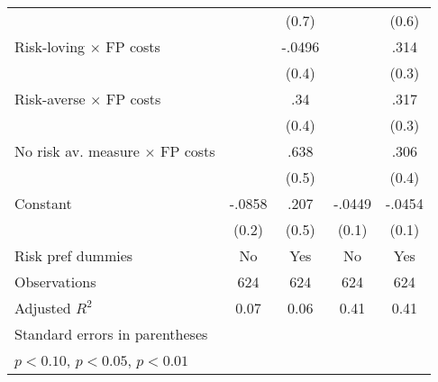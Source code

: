 \begin{table}[htbp]
\begin{tabular}{l*{4}{c}}
                &                  &    (0.7)         &                  &    (0.6)         \\
Risk-loving $\times$ FP costs&                  &   -.0496         &                  &     .314         \\
                &                  &    (0.4)         &                  &    (0.3)         \\
Risk-averse $\times$ FP costs&                  &      .34         &                  &     .317         \\
                &                  &    (0.4)         &                  &    (0.3)         \\
No risk av. measure $\times$ FP costs&                  &     .638         &                  &     .306         \\
                &                  &    (0.5)         &                  &    (0.4)         \\
Constant        &   -.0858         &     .207         &   -.0449         &   -.0454         \\
                &    (0.2)         &    (0.5)         &    (0.1)         &    (0.1)         \\
Risk pref dummies &       No         &      Yes         &       No         &      Yes         \\
\hline
Observations    &      624         &      624         &      624         &      624         \\
Adjusted \(R^{2}\)&     0.07         &     0.06         &     0.41         &     0.41         \\
\hline\hline
\multicolumn{5}{l}{\footnotesize Standard errors in parentheses}\\
\multicolumn{5}{l}{\footnotesize \sym{*} \(p<0.10\), \sym{**} \(p<0.05\), \sym{***} \(p<0.01\)}\\
\end{tabular}
\end{table}
